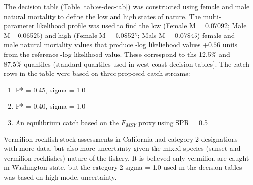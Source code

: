 \documentclass[11pt,
  english,
  a4paper,
]{article}
\begin{document}
\clearpage




The decision table (Table \ref{tab:es-dec-tab}) was constructed using female and male natural mortality to define the low and high states of nature. The multi-parameter likelihood profile was used to find the low (Female M = 0.07092; Male M= 0.06525) and high (Female M = 0.08527; Male M = 0.07845) female and male natural mortality values that produce -log likeliehood values +0.66 units from the reference -log likelihood value. These correspond to the 12.5\% and 87.5\% quantiles (standard quantiles used in west coast decision tables). The catch rows in the table were based on three proposed catch streams:

\leavevmode\tagmcend\tagstructend\par


\begin{enumerate}
\def\labelenumi{\arabic{enumi}.}
\item

  P* = 0.45, sigma = 1.0

  \tagmcend\tagstructend\tagstructend
\item

  P* = 0.40, sigma = 1.0

  \tagmcend\tagstructend\tagstructend
\item

  An equilibrium catch based on the {\(F_{MSY}\)\leavevmode\tagmcend\tagstructend} proxy using SPR = 0.5

  \tagmcend\tagstructend\tagstructend
\end{enumerate}

\tagstructend


Vermilion rockfish stock assessments in California had category 2 designations with more data, but also more uncertainty given the mixed species (sunset and vermilion rockfishes) nature of the fishery. It is believed only vermilion are caught in Washington state, but the category 2 sigma = 1.0 used in the decision tables was based on high model uncertainty.
\end{document}
